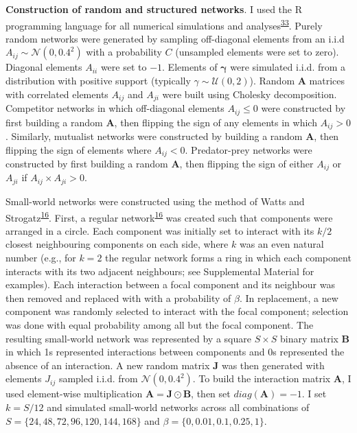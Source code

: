 \documentclass[]{article}
\begin{document}
\textbf{Construction of random and structured networks}. I used the R
programming language for all numerical simulations and
analyses\textsuperscript{\protect\hyperlink{ref-Rproject}{33}}. Purely
random networks were generated by sampling off-diagonal elements from an
i.i.d \(A_{ij} \sim \mathcal{N}(0, 0.4^{2})\) with a probability \(C\)
(unsampled elements were set to zero). Diagonal elements \(A_{ii}\) were
set to \(-1\). Elements of \(\boldsymbol{\gamma}\) were simulated i.i.d.
from a distribution with positive support (typically
\(\gamma \sim \mathcal{U}(0, 2)\)). Random \(\mathbf{A}\) matrices with
correlated elements \(A_{ij}\) and \(A_{ji}\) were built using Cholesky
decomposition. Competitor networks in which off-diagonal elements
\(A_{ij} \leq 0\) were constructed by first building a random
\(\mathbf{A}\), then flipping the sign of any elements in which
\(A_{ij} > 0\). Similarly, mutualist networks were constructed by
building a random \(\mathbf{A}\), then flipping the sign of elements
where \(A_{ij} < 0\). Predator-prey networks were constructed by first
building a random \(\mathbf{A}\), then flipping the sign of either
\(A_{ij}\) or \(A_{ji}\) if \(A_{ij} \times A_{ji} > 0\).

Small-world networks were constructed using the method of Watts and
Strogatz\textsuperscript{\protect\hyperlink{ref-Watts1998}{16}}. First,
a regular network\textsuperscript{\protect\hyperlink{ref-Watts1998}{16}}
was created such that components were arranged in a circle. Each
component was initially set to interact with its \(k/2\) closest
neighbouring components on each side, where \(k\) was an even natural
number (e.g., for \(k = 2\) the regular network forms a ring in which
each component interacts with its two adjacent neighbours; see
Supplemental Material for examples). Each interaction between a focal
component and its neighbour was then removed and replaced with with a
probability of \(\beta\). In replacement, a new component was randomly
selected to interact with the focal component; selection was done with
equal probability among all but the focal component. The resulting
small-world network was represented by a square \(S \times S\) binary
matrix \(\mathbf{B}\) in which 1s represented interactions between
components and 0s represented the absence of an interaction. A new
random matrix \(\mathbf{J}\) was then generated with elements \(J_{ij}\)
sampled i.i.d. from \(\mathcal{N}(0, 0.4^{2})\). To build the
interaction matrix \(\mathbf{A}\), I used element-wise multiplication
\(\mathbf{A} = \mathbf{J} \odot \mathbf{B}\), then set
\(diag(\mathbf{A}) = -1\). I set \(k = S/12\) and simulated small-world
networks across all combinations of
\(S = \{24, 48, 72, 96, 120, 144, 168\}\) and
\(\beta = \{0, 0.01, 0.1, 0.25, 1\}\).
\end{document}
